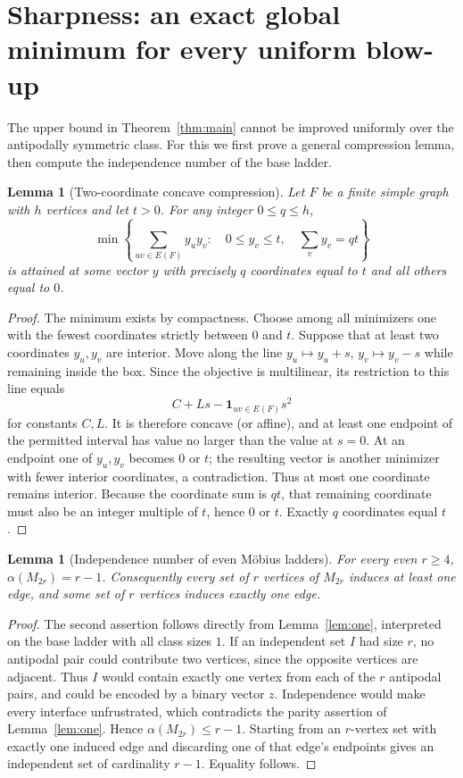 \documentclass[11pt,a4paper]{article}
\newtheorem{lemma}[theorem]{Lemma}
\begin{document}
\section{Sharpness: an exact global minimum for every uniform blow-up}
The upper bound in Theorem~\ref{thm:main} cannot be improved uniformly over the antipodally symmetric class. For this we first prove a general compression lemma, then compute the independence number of the base ladder.
\begin{lemma}[Two-coordinate concave compression]\label{lem:compress}
Let $F$ be a finite simple graph with $h$ vertices and let $t>0$. For any integer $0\le q\le h$,
\[
 \min\left\{\sum_{uv\in E(F)}y_uy_v:\quad 0\le y_v\le t,\quad\sum_v y_v=qt\right\}
\]
is attained at some vector $y$ with precisely $q$ coordinates equal to $t$ and all others equal to $0$.
\end{lemma}
\begin{proof}
The minimum exists by compactness. Choose among all minimizers one with the fewest coordinates strictly between $0$ and $t$. Suppose that at least two coordinates $y_u,y_v$ are interior. Move along the line $y_u\mapsto y_u+s$, $y_v\mapsto y_v-s$ while remaining inside the box. Since the objective is multilinear, its restriction to this line equals
\[
 C+Ls-\mathbf1_{uv\in E(F)}s^2
\]
for constants $C,L$. It is therefore concave (or affine), and at least one endpoint of the permitted interval has value no larger than the value at $s=0$. At an endpoint one of $y_u,y_v$ becomes $0$ or $t$; the resulting vector is another minimizer with fewer interior coordinates, a contradiction. Thus at most one coordinate remains interior. Because the coordinate sum is $qt$, that remaining coordinate must also be an integer multiple of $t$, hence $0$ or $t$. Exactly $q$ coordinates equal $t$.
\end{proof}
\begin{lemma}[Independence number of even M\"obius ladders]\label{lem:alpha}
For every even $r\ge4$, $\alpha(M_{2r})=r-1$. Consequently every set of $r$ vertices of $M_{2r}$ induces at least one edge, and some set of $r$ vertices induces exactly one edge.
\end{lemma}
\begin{proof}
The second assertion follows directly from Lemma~\ref{lem:one}, interpreted on the base ladder with all class sizes $1$. If an independent set $I$ had size $r$, no antipodal pair could contribute two vertices, since the opposite vertices are adjacent. Thus $I$ would contain exactly one vertex from each of the $r$ antipodal pairs, and could be encoded by a binary vector $z$. Independence would make every interface unfrustrated, which contradicts the parity assertion of Lemma~\ref{lem:one}. Hence $\alpha(M_{2r})\le r-1$. Starting from an $r$-vertex set with exactly one induced edge and discarding one of that edge's endpoints gives an independent set of cardinality $r-1$. Equality follows.
\end{proof}
\end{document}
